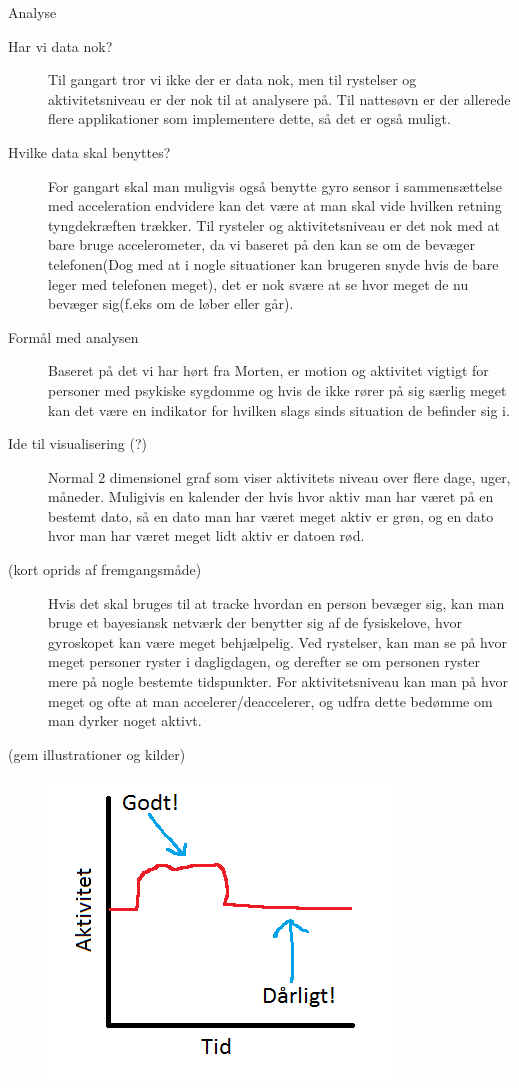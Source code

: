 Analyse
\begin{description}
\item[Har vi data nok?] Til gangart tror vi ikke der er data nok, men til rystelser og aktivitetsniveau er der nok til at analysere på. Til nattesøvn er der allerede flere applikationer som implementere dette, så det er også muligt.
\item[Hvilke data skal benyttes?] For gangart skal man muligvis også benytte gyro sensor i sammensættelse med acceleration endvidere kan det være at man skal vide hvilken retning tyngdekræften trækker. Til rysteler og aktivitetsniveau er det nok med at bare bruge accelerometer, da vi baseret på den kan se om de bevæger telefonen(Dog med at i nogle situationer kan brugeren snyde hvis de bare leger med telefonen meget), det er nok svære at se hvor meget de nu bevæger sig(f.eks om de løber eller går). 
\item[Formål med analysen] Baseret på det vi har hørt fra Morten, er motion og aktivitet vigtigt for personer med psykiske sygdomme og hvis de ikke rører på sig særlig meget kan det være en indikator for hvilken slags sinds situation de befinder sig i.
\item[Ide til visualisering (?)] Normal 2 dimensionel graf som viser aktivitets niveau over flere dage, uger, måneder. Muligivis en kalender der hvis hvor aktiv man har været på en bestemt dato, så en dato man har været meget aktiv er grøn, og en dato hvor man har været meget lidt aktiv er datoen rød.
\item[(kort oprids af fremgangsmåde)] Hvis det skal bruges til at tracke hvordan en person bevæger sig, kan man bruge et bayesiansk netværk der benytter sig af de fysiskelove, hvor gyroskopet kan være meget behjælpelig. Ved rystelser, kan man se på hvor meget personer ryster i dagligdagen, og derefter se om personen ryster mere på nogle bestemte tidspunkter. For aktivitetsniveau kan man på hvor meget og ofte at man accelerer/deaccelerer, og udfra dette bedømme om man dyrker noget aktivt.
\item[(gem illustrationer og kilder)] \includegraphics{aktivitet_billed}
\end{description}